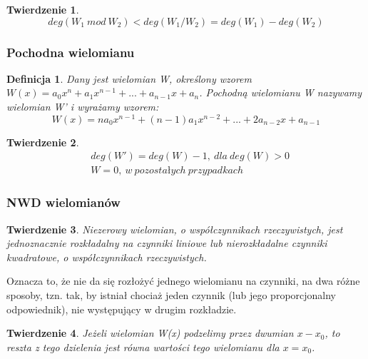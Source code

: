 \documentclass[twoside,a4paper]{book}
\newtheorem{theorem}{Twierdzenie}
\newtheorem{definition}{Definicja}
\begin{document}
\begin{theorem}
	\begin{equation}
	deg(W_1\ mod\ W_2) < deg(W_1 / W_2) = deg(W_1) - deg(W_2)
	\end{equation}
\end{theorem}


\subsubsection{Pochodna wielomianu}

\begin{definition}
	Dany jest wielomian W, określony wzorem $W(x) = a_0x^n + a_1x^{n-1} + ... + a_{n-1}x + a_n$. Pochodną wielomianu W nazywamy wielomian W' i wyrażamy wzorem:
	\begin{equation}
	W(x) = na_0x^{n-1} + (n-1)a_1x^{n-2} + ... + 2a_{n-2}x + a_{n-1}
	\end{equation}
\end{definition}

\begin{theorem}
	\begin{equation}
	\begin{split}
		&deg(W') = deg(W) - 1,\ dla\ deg(W) > 0 \\
		&W = 0,\ w\ pozostałych\ przypadkach
	\end{split}
	\end{equation}
\end{theorem}

\subsubsection{NWD wielomianów}

\begin{theorem}
	Niezerowy wielomian, o współczynnikach rzeczywistych, jest jednoznacznie rozkładalny na czynniki liniowe lub nierozkładalne czynniki kwadratowe, o współczynnikach rzeczywistych.
\end{theorem}

Oznacza to, że nie da się rozłożyć jednego wielomianu na czynniki, na dwa różne sposoby, tzn. tak, by istniał chociaż jeden czynnik (lub jego proporcjonalny odpowiednik), nie występujący w drugim rozkładzie.

\begin{theorem}
	Jeżeli wielomian W(x) podzelimy przez dwumian $x - x_0$, to reszta z tego dzielenia jest równa wartości tego wielomianu dla $x = x_0$.
\end{theorem}
\end{document}
